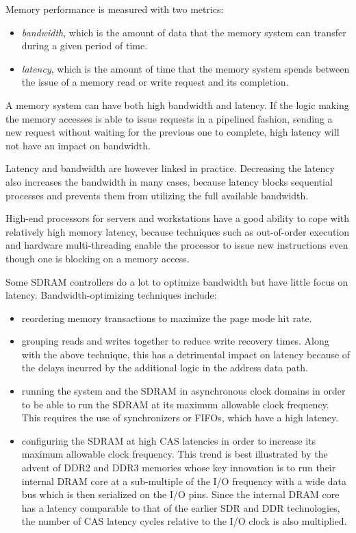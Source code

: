 \documentclass[a4paper,11pt]{kthesis}
\begin{document}
Memory performance is measured with two metrics:
\begin{itemize}
\item \textit{bandwidth}, which is the amount of data that the memory system can transfer during a given period of time.
\item \textit{latency}, which is the amount of time that the memory system spends between the issue of a memory read or write request and its completion.
\end{itemize}

A memory system can have both high bandwidth and latency. If the logic making the memory accesses is able to issue requests in a pipelined fashion, sending a new request without waiting for the previous one to complete, high latency will not have an impact on bandwidth.

Latency and bandwidth are however linked in practice. Decreasing the latency also increases the bandwidth in many cases, because latency blocks sequential processes and prevents them from utilizing the full available bandwidth.

High-end processors for servers and workstations have a good ability to cope with relatively high memory latency, because techniques such as out-of-order execution and hardware multi-threading enable the processor to issue new instructions even though one is blocking on a memory access.

Some SDRAM controllers do a lot to optimize bandwidth but have little focus on latency. Bandwidth-optimizing techniques include:
\begin{itemize}
\item reordering memory transactions to maximize the page mode hit rate.
\item grouping reads and writes together to reduce write recovery times. Along with the above technique, this has a detrimental impact on latency because of the delays incurred by the additional logic in the address data path.
\item running the system and the SDRAM in asynchronous clock domains in order to be able to run the SDRAM at its maximum allowable clock frequency. This requires the use of synchronizers or FIFOs, which have a high latency.
\item configuring the SDRAM at high CAS latencies in order to increase its maximum allowable clock frequency. This trend is best illustrated by the advent of DDR2 and DDR3 memories whose key innovation is to run their internal DRAM core at a sub-multiple of the I/O frequency with a wide data bus which is then serialized on the I/O pins. Since the internal DRAM core has a latency comparable to that of the earlier SDR and DDR technologies, the number of CAS latency cycles relative to the I/O clock is also multiplied.
\end{itemize}
\end{document}
